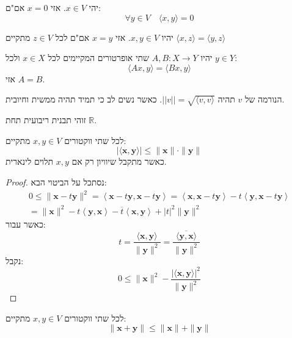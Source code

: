 \documentclass{tstextbook}
\begin{document}
\begin{proposition}
יהי \(x \in V\). אזי \(x=0\) אם"ם:
$$\forall y \in V\quad \langle x,y \rangle=0 $$

\end{proposition}
\begin{corollary}
יהיו \(x,y \in V\). אזי \(x=y\) אם"ם לכל \(z \in V\) מתקיים \(\langle x,z \rangle=\langle y,z \rangle\)

\end{corollary}
\begin{corollary}
יהיו \(A,B:X\to Y\) שתי אופרטורים המקיימים לכל \(x \in X\) ולכל \(y \in Y\):
$$\langle Ax,y \rangle =\langle Bx,y \rangle $$
אזי \(A=B\).

\end{corollary}
\begin{definition}[נורמה]
הנורמה של \(v\) תהיה \(||v|| = \sqrt{\langle v, v \rangle}\). כאשר נשים לב כי תמיד תהיה ממשית וחיובית.

\end{definition}
\begin{remark}
זוהי תבנית ריבועית תחת \(\mathbb{R}\).

\end{remark}
\begin{theorem}
לכל שתי ווקטורים \(x,y \in V\) מתקיים:
$$|\langle\mathbf{x},\mathbf{y}\rangle|\leq\|\mathbf{x}\|\cdot\|\mathbf{y}\|$$
כאשר מתקבל שיוויון רק אם \(x,y\) תלוים לינארית.

\end{theorem}
\begin{proof}
נסתכל על הביטוי הבא:
\begin{gather*}0\leq\|\mathbf{x}-t\mathbf{y}\|^{2}=\left\langle \mathbf{x}-t\mathbf{y},\mathbf{x}-t\mathbf{y} \right\rangle=\left\langle \mathbf{x},\mathbf{x}-t\mathbf{y} \right\rangle-t\left\langle \mathbf{y},\mathbf{x}-t\mathbf{y} \right\rangle\\=\|\mathbf{x}\|^{2}-t\left\langle \mathbf{y},\mathbf{x} \right\rangle-\overline{t}\left\langle \mathbf{x},\mathbf{y} \right\rangle+|t|^{2}\|\mathbf{y}\|^{2} 
\end{gather*}
כאשר עבור:
$$t={\frac{\langle\mathbf{x},\mathbf{y}\rangle}{\|\mathbf{y}\|^{2}}}={\frac{\overline{{\langle\mathbf{y},\mathbf{x}\rangle}}}{\|\mathbf{y}\|^{2}}}$$
נקבל:
$$0\leq\|\mathbf{x}\|^{2}-{\frac{|\langle\mathbf{x},\mathbf{y}\rangle|^{2}}{\|\mathbf{y}\|^{2}}}$$

\end{proof}
\begin{corollary}
לכל שתי ווקטורים \(x,y \in V\) מתקיים:
$$\|\mathbf{x}+\mathbf{y}\|\leq\|\mathbf{x}\|+\|\mathbf{y}\|$$

\end{corollary}
\end{document}

